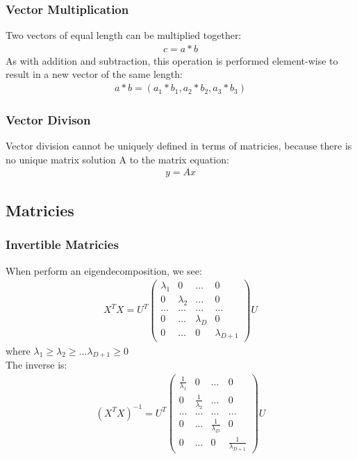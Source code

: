 \documentclass{article}
\begin{document}
\subsubsection{Vector Multiplication}
Two vectors of equal length can be multiplied together:
\begin{align*}
c = a * b
\end{align*}
As with addition and subtraction, this operation is performed element-wise to result in a new vector of the same length:
\begin{align*}
a * b = (a_1 * b_1, a_2 * b_2, a_3 * b_3)
\end{align*}

\subsubsection{Vector Divison}
Vector division cannot be uniquely defined in terms of matricies, because there is no unique matrix solution A to the matrix equation:
\begin{align*}
y = Ax
\end{align*}

\subsection{Matricies}
\subsubsection{Invertible Matricies}
When perform an eigendecomposition, we see:
\begin{align*}
X^TX = U^T \left(\begin{array}{cccc}
\lambda_1 & 0 & ... & 0\\
0 & \lambda_2 & ... & 0\\
... & ... & ... & ...\\
0 & ... & \lambda_D & 0\\
0 & ... & 0 & \lambda_{D+1}
\end{array}\right) U
\end{align*}
where $\lambda_1  \geq \lambda_2  \geq ... \lambda_{D+1}  \geq 0 $\\
The inverse is:
\begin{align*}
(X^TX)^{-1} = U^T \left(\begin{array}{cccc}
\frac{1}{\lambda_1} & 0 & ... & 0\\
0 & \frac{1}{\lambda_2} & ... & 0\\
... & ... & ... & ...\\
0 & ... & \frac{1}{\lambda_D} & 0\\
0 & ... & 0 & \frac{1}{\lambda_{D+1}}
\end{array}\right) U
\end{align*}
\end{document}
